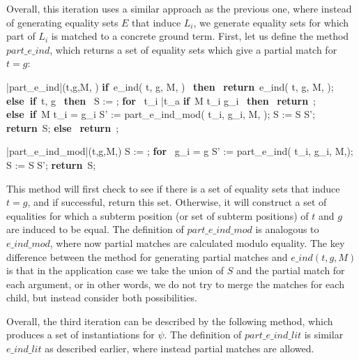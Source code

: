 \documentclass{llncs}
\def\IF{\qtab\keyword{if}\ }
\def\THEN{\ \keyword{then}\ }
\def\ELSE{\untab\qtab\keyword{else}\ }
\def\ELSEIF{\untab\qtab\keyword{else if}\ }
\def\FI{\untab}
\def\RETURN{\keyword{return}\ }
\def\ENDPROC{\untab}
\def\DOFOR{\qtab\keyword{for}\ }
\def\ENDFOR{\untab}
\def\keyword#1{\mbox{\normalshape\bf #1}}
\begin{document}
Overall, this iteration uses a similar approach as the previous one, where instead of generating equality sets $E$ that induce $L_i$, we generate equality sets for which part of $L_i$ is matched to a concrete ground term.
First, let us define the method $part\_e\_ind$, which returns a set of equality sets which give a partial match for $t = g$:

\begin{minipage}[t]{.4\linewidth}
\begin{program}
\PROC |part\_e\_ind|(t,g,M, \psi) \BODY
\IF e\_ind( t, g, M, \psi ) \neq \emptyset \THEN
  \RETURN e\_ind( t, g, M, \psi );
\ELSEIF t, g  \THEN
  S := \emptyset;
  \DOFOR {} t_i  \bar{t_a} 
    \IF M \models t_i \neq g_i \THEN
      \RETURN \emptyset;
    \ELSEIF M \not\models t_i = g_i
      S' := part\_e\_ind\_mod( t_i, g_i, M, \psi );
      S := S \cup S';
    \FI
  \ENDFOR
  \RETURN S;
\ELSE
  \RETURN \emptyset;
\FI
\ENDPROC
\end{program}
\end{minipage}
\begin{minipage}[t]{.4\linewidth}
\begin{program}
\PROC |part\_e\_ind\_mod|(t,g,M,\psi) \BODY
  S := \emptyset;
  \DOFOR {} g_i = g
    S' := part\_e\_ind( t_i, g_i, M,\psi );
    S := S \cup S';
  \ENDFOR
  \RETURN S;
\ENDPROC
\end{program}
\end{minipage}

This method will first check to see if there is a set of equality sets that induce $t = g$, and if successful, return this set.
Otherwise, it will construct a set of equalities for which a subterm position (or set of subterm positions) of $t$ and $g$ are induced to be equal.
The definition of $part\_e\_ind\_mod$ is analogous to $e\_ind\_mod$, where now partial matches are calculated modulo equality.
The key difference between the method for generating partial matches and $e\_ind( t, g, M )$ is that in the application case we take the union of $S$ and the partial match for each argument, or in other words, we do not try to merge the matches for each child, but instead consider both possibilities.

Overall, the third iteration can be described by the following method, which produces a set of instantiations for $\psi$.
The definition of $part\_e\_ind\_lit$ is similar $e\_ind\_lit$ as described earlier, where instead partial matches are allowed.
\end{document}
